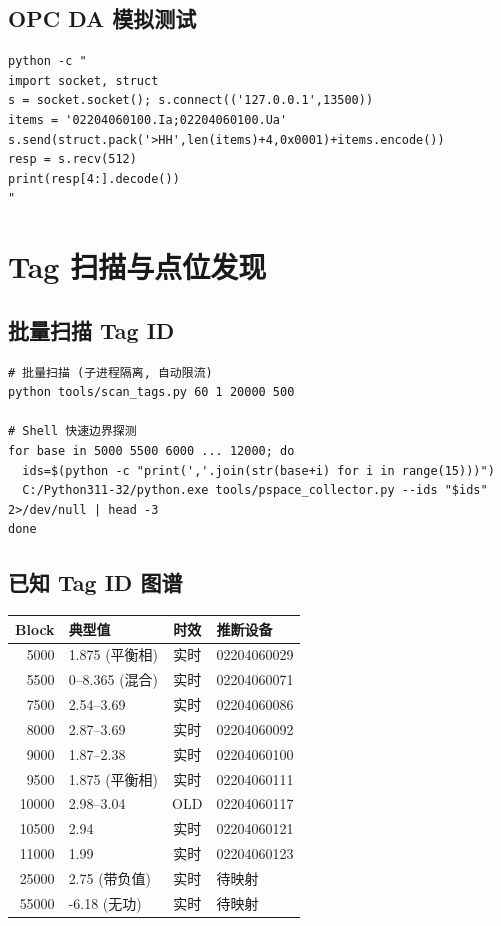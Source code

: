 \documentclass[12pt,a4paper]{ctexart}
\begin{document}
\subsection{OPC DA 模拟测试}
\begin{lstlisting}
python -c "
import socket, struct
s = socket.socket(); s.connect(('127.0.0.1',13500))
items = '02204060100.Ia;02204060100.Ua'
s.send(struct.pack('>HH',len(items)+4,0x0001)+items.encode())
resp = s.recv(512)
print(resp[4:].decode())
"
\end{lstlisting}

\section{Tag 扫描与点位发现}

\subsection{批量扫描 Tag ID}
\begin{lstlisting}
# 批量扫描 (子进程隔离, 自动限流)
python tools/scan_tags.py 60 1 20000 500

# Shell 快速边界探测
for base in 5000 5500 6000 ... 12000; do
  ids=$(python -c "print(','.join(str(base+i) for i in range(15)))")
  C:/Python311-32/python.exe tools/pspace_collector.py --ids "$ids" 2>/dev/null | head -3
done
\end{lstlisting}

\subsection{已知 Tag ID 图谱}
\begin{table}[H]\centering
\begin{tabular}{rlcl}
\toprule
\textbf{Block} & \textbf{典型值} & \textbf{时效} & \textbf{推断设备} \\
\midrule
5000 & 1.875 (平衡相) & 实时 & 02204060029 \\
5500 & 0--8.365 (混合) & 实时 & 02204060071 \\
7500 & 2.54--3.69 & 实时 & 02204060086 \\
8000 & 2.87--3.69 & 实时 & 02204060092 \\
9000 & 1.87--2.38 & 实时 & 02204060100 \\
9500 & 1.875 (平衡相) & 实时 & 02204060111 \\
10000 & 2.98--3.04 & OLD & 02204060117 \\
10500 & 2.94 & 实时 & 02204060121 \\
11000 & 1.99 & 实时 & 02204060123 \\
25000 & 2.75 (带负值) & 实时 & 待映射 \\
55000 & -6.18 (无功) & 实时 & 待映射 \\
\bottomrule
\end{tabular}
\end{table}
\end{document}
